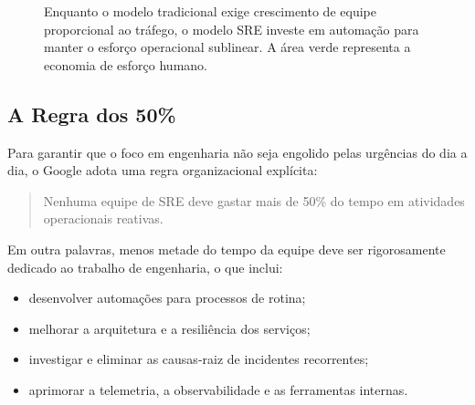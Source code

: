\documentclass[12pt,a4paper,twoside]{report}
\begin{document}
\begin{figure}[h]
    \centering
    \caption{Enquanto o modelo tradicional exige crescimento de equipe proporcional ao tráfego, o modelo SRE investe em automação para manter o esforço operacional sublinear. A área verde representa a economia de esforço humano.}
\end{figure}

\subsection{A Regra dos 50\%}

Para garantir que o foco em engenharia não seja engolido pelas urgências do dia a dia, o Google adota uma regra organizacional explícita:
\begin{quote}
Nenhuma equipe de SRE deve gastar mais de 50\% do tempo em atividades operacionais reativas.
\end{quote}

Em outra palavras, menos metade do tempo da equipe deve ser rigorosamente dedicado ao trabalho de engenharia, o que inclui:
\begin{itemize}[nosep]
    \item desenvolver automações para processos de rotina;
    \item melhorar a arquitetura e a resiliência dos serviços;
    \item investigar e eliminar as causas-raiz de incidentes recorrentes;
    \item aprimorar a telemetria, a observabilidade e as ferramentas internas.
\end{itemize}
\end{document}
